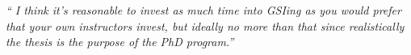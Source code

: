 \documentclass[12pt]{beamer}
\newcommand\ans[1]{{\it ``#1''}}
\begin{document}
\begin{frame}
  
\ans{ I  think  it's reasonable  to  invest  as  much  time  into  GSIing  as  you  would  prefer  that  your  own instructors  invest,  but  ideally  no  more  than  that  since  realistically  the  thesis  is  the purpose of the PhD program.}







\end{frame}
\end{document}

